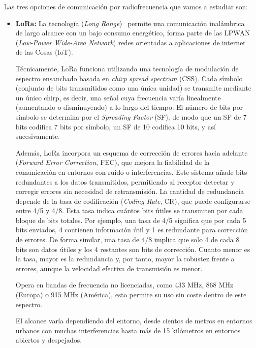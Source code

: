 Las tres opciones de comunicación por radiofrecuencia que vamos a estudiar son:

\begin{itemize}
    \item \textbf{LoRa:} La tecnología (\emph{Long Range})~\cite{augustin_lora} permite una comunicación inalámbrica de largo alcance con un bajo consumo energético,
    forma parte de las LPWAN (\emph{Low-Power Wide-Area Network}) redes orientadas a aplicaciones de internet de las Cosas (IoT).

    Técnicamente, LoRa funciona utilizando una tecnología de modulación de espectro ensanchado basada en \emph{chirp spread spectrum} (CSS).
    Cada símbolo (conjunto de bits transmitidos como una única unidad) se transmite mediante un único chirp, es decir,
    una señal cuya frecuencia varía linealmente (aumentando o disminuyendo) a lo largo del tiempo.
    El número de bits por símbolo se determina por el \emph{Spreading Factor} (SF), de modo que un SF de 7 bits codifica 7 bits por símbolo,
    un SF de 10 codifica 10 bits, y así sucesivamente.

    Además, LoRa incorpora un esquema de corrección de errores hacia adelante (\emph{Forward Error Correction}, FEC), que mejora la fiabilidad de la comunicación en entornos con ruido o interferencias.
    Este sistema añade bits redundantes a los datos transmitidos, permitiendo al receptor detectar y corregir errores sin necesidad de retransmisión.
    La cantidad de redundancia depende de la tasa de codificación (\emph{Coding Rate}, CR), que puede configurarse entre 4/5 y 4/8.
    Esta tasa indica cuántos bits útiles se transmiten por cada bloque de bits totales.
    Por ejemplo, una tasa de 4/5 significa que por cada 5 bits enviados, 4 contienen información útil y 1 es redundante para corrección de errores.
    De forma similar, una tasa de 4/8 implica que solo 4 de cada 8 bits son datos útiles y los 4 restantes son bits de corrección.
    Cuanto menor es la tasa, mayor es la redundancia y, por tanto, mayor la robustez frente a errores, aunque la velocidad efectiva de transmisión es menor.

    Opera en bandas de frecuencia no licenciadas, como 433 MHz, 868 MHz (Europa) o 915 MHz (América),
    esto permite su uso sin coste dentro de este espectro.

    El alcance varía dependiendo del entorno, desde cientos de metros en entornos urbanos con muchas interferencias hasta más de 15 kilómetros en entornos abiertos y despejados.


\end{itemize}
